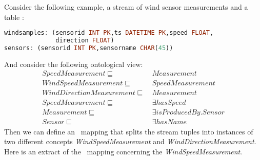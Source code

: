 




Consider the following example, a stream  of wind sensor measurements  and a table :
\begin{lstlisting}[style=HaskellSNEE,language=Haskell,frame=none]
windsamples: (sensorid INT PK,ts DATETIME PK,speed FLOAT,
              direction FLOAT)
sensors: (sensorid INT PK,sensorname CHAR(45))
\end{lstlisting}
And consider the following ontological view:
\begin{align*}%
SpeedMeasurement \sqsubseteq\ & Measurement \\
WindSpeedMeasurement \sqsubseteq\ & SpeedMeasurement \\
WindDirectionMeasurement \sqsubseteq\ & Measurement \\
SpeedMeasurement \sqsubseteq\ & \exists hasSpeed \\
Measurement \sqsubseteq\ & \exists isProducedBy.Sensor \\
Sensor \sqsubseteq\ & \exists hasName
\end{align*}
%
Then we can define an \stwoo\ mapping that splits the \linebreak {} stream tuples into instances of two different concepts \textit{WindSpeedMeasurement} and \textit{WindDirectionMeasurement}. Here is an extract of the \stwoo\ mapping concerning the \textit{WindSpeedMeasurement}.

